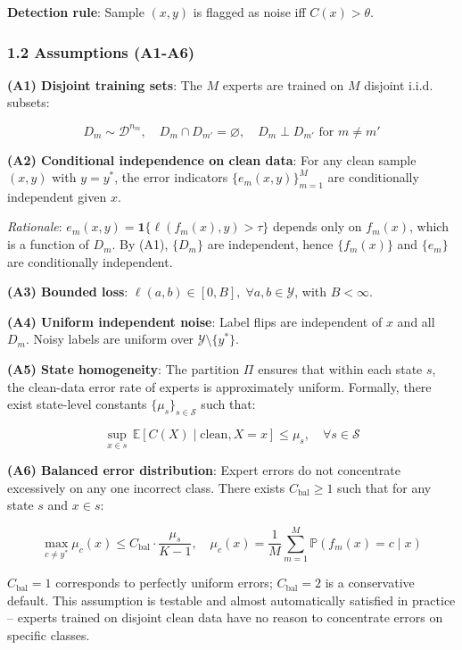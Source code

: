 \documentclass[
  12pt,
]{ctexart}
\begin{document}
\textbf{Detection rule}: Sample \((x, y)\) is flagged as noise iff
\(C(x) > \theta\).

\subsubsection{1.2 Assumptions (A1-A6)}\label{assumptions-a1-a6}

\textbf{(A1) Disjoint training sets}: The \(M\) experts are trained on
\(M\) disjoint i.i.d. subsets:

\[D_m \sim \mathcal{D}^{n_m}, \quad D_m \cap D_{m'} = \varnothing, \quad D_m \perp D_{m'} \text{ for } m \neq m'\]

\textbf{(A2) Conditional independence on clean data}: For any clean
sample \((x, y)\) with \(y = y^*\), the error indicators
\(\{e_m(x, y)\}_{m=1}^M\) are conditionally independent given \(x\).

\emph{Rationale}: \(e_m(x, y) = \mathbf{1}\{\ell(f_m(x), y) > \tau\}\)
depends only on \(f_m(x)\), which is a function of \(D_m\). By (A1),
\(\{D_m\}\) are independent, hence \(\{f_m(x)\}\) and \(\{e_m\}\) are
conditionally independent.

\textbf{(A3) Bounded loss}:
\(\ell(a, b) \in [0, B], \; \forall a, b \in \mathcal{Y}\), with
\(B < \infty\).

\textbf{(A4) Uniform independent noise}: Label flips are independent of
\(x\) and all \(D_m\). Noisy labels are uniform over
\(\mathcal{Y} \setminus \{y^*\}\).

\textbf{(A5) State homogeneity}: The partition \(\Pi\) ensures that
within each state \(s\), the clean-data error rate of experts is
approximately uniform. Formally, there exist state-level constants
\(\{\mu_s\}_{s \in \mathcal{S}}\) such that:

\[\sup_{x \in s} \, \mathbb{E}[C(X) \mid \text{clean}, X = x] \leq \mu_s, \quad \forall s \in \mathcal{S}\]

\textbf{(A6) Balanced error distribution}: Expert errors do not
concentrate excessively on any one incorrect class. There exists
\(C_{\text{bal}} \geq 1\) such that for any state \(s\) and \(x \in s\):

\[\max_{c \neq y^*} \mu_c(x) \leq C_{\text{bal}} \cdot \frac{\mu_s}{K-1}, \quad \mu_c(x) = \frac{1}{M} \sum_{m=1}^M \mathbb{P}(f_m(x) = c \mid x)\]

\(C_{\text{bal}} = 1\) corresponds to perfectly uniform errors;
\(C_{\text{bal}} = 2\) is a conservative default. This assumption is
testable and almost automatically satisfied in practice -- experts
trained on disjoint clean data have no reason to concentrate errors on
specific classes.
\end{document}
